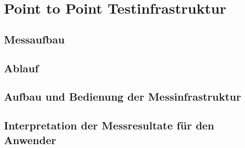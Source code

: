 \clearpage
\section{Point to Point Testinfrastruktur}\label{sec:PointtoPointTestinfrastruktur}

\subsection{Messaufbau}\label{sec:Messaufbau}

\subsection{Ablauf}\label{sec:Ablauf}

\subsection{Aufbau und Bedienung der Messinfrastruktur}\label{sec:AufbauundBedienungderMessinfrastruktur}

\subsection{Interpretation der Messresultate für den Anwender}\label{sec:InterpretationderMessresultatefürdenAnwender}